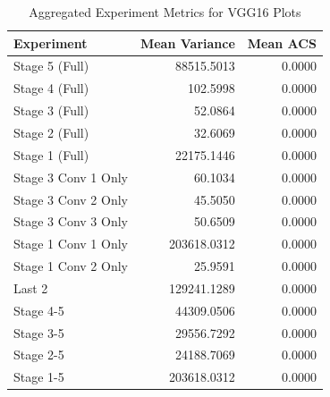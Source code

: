 \begin{table}
\caption{Aggregated Experiment Metrics for VGG16 Plots}
\label{tab:exp_plot_data_vgg16}
\begin{tabular}{lrr}
\toprule
Experiment & Mean Variance & Mean ACS \\
\midrule
Stage 5 (Full) & 88515.5013 & 0.0000 \\
Stage 4 (Full) & 102.5998 & 0.0000 \\
Stage 3 (Full) & 52.0864 & 0.0000 \\
Stage 2 (Full) & 32.6069 & 0.0000 \\
Stage 1 (Full) & 22175.1446 & 0.0000 \\
Stage 3 Conv 1 Only & 60.1034 & 0.0000 \\
Stage 3 Conv 2 Only & 45.5050 & 0.0000 \\
Stage 3 Conv 3 Only & 50.6509 & 0.0000 \\
Stage 1 Conv 1 Only & 203618.0312 & 0.0000 \\
Stage 1 Conv 2 Only & 25.9591 & 0.0000 \\
Last 2 & 129241.1289 & 0.0000 \\
Stage 4-5 & 44309.0506 & 0.0000 \\
Stage 3-5 & 29556.7292 & 0.0000 \\
Stage 2-5 & 24188.7069 & 0.0000 \\
Stage 1-5 & 203618.0312 & 0.0000 \\
\bottomrule
\end{tabular}
\end{table}
